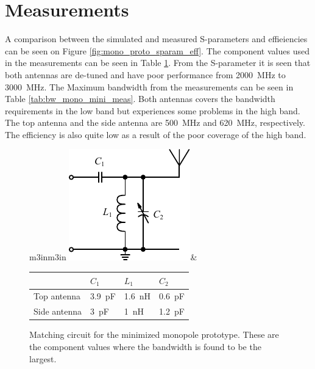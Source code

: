\FloatBarrier
\section{Measurements}
A comparison between the simulated and measured S-parameters and effieiencies can be seen on Figure \ref{fig:mono_proto_sparam_eff}. The component values used in the measurements can be seen in Table \ref{fig:matching_mono_mini_meas}. From the S-parameter it is seen that both antennas are de-tuned and have poor performance from \SI{2000}{MHz} to \SI{3000}{MHz}. The Maximum bandwidth from the measurements can be seen in Table \ref{tab:bw_mono_mini_meas}. Both antennas covers the bandwidth requirements in the low band but experiences some problems in the high band. The top antenna and the side antenna are \SI{500}{MHz} and \SI{620}{MHz}, respectively. 
The efficiency is also quite low as a result of the poor coverage of the high band. 

\begin{figure}[htbp]
        \centering
        \begin{tabular}{m{3in}m{3in}}
            \centering
            \includegraphics{img/tech_sol/schematic_tuning_1}&
            \centering
            \footnotesize
            \begin{tabular}{|l|l|l|l|}
                \hline
                & $C_1$ & $L_1$ & $C_2$ \\
                \hline
              Top antenna & \SI{3.9}{pF} & \SI{1.6}{nH} & \SI{0.6}{pF} \\
                Side antenna & \SI{3}{pF} & \SI{1}{nH} & \SI{1.2}{pF} \\
                \hline
            \end{tabular}
        \end{tabular}
    \caption{Matching circuit for the minimized monopole prototype. These are the component values where the bandwidth is found to be the largest.}
    \label{fig:matching_mono_mini_meas}
\end{figure}

